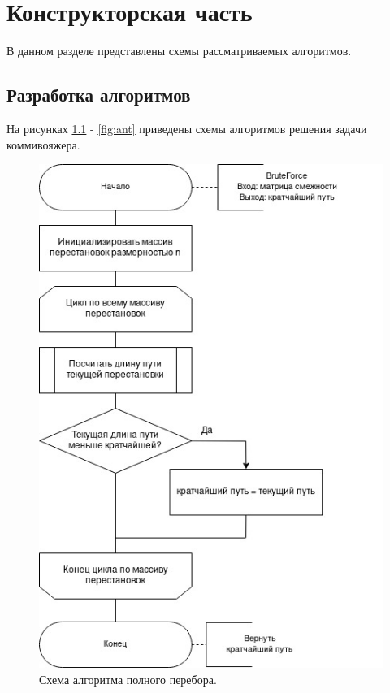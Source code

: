 \documentclass[12pt]{report}
\begin{document}
\chapter{Конструкторская часть}
	
В данном разделе представлены схемы рассматриваемых алгоритмов.
	
\section{Разработка алгоритмов}
	
На рисунках \ref{fig:bruteforce} - \ref{fig:ant} приведены схемы алгоритмов решения задачи коммивояжера.
	
\begin{figure}[H]
		\centering
		\includegraphics[scale=0.62]{bruteforce.jpg}
		\caption{Схема алгоритма полного перебора.}
		\label{fig:bruteforce}
\end{figure}
\end{document}

